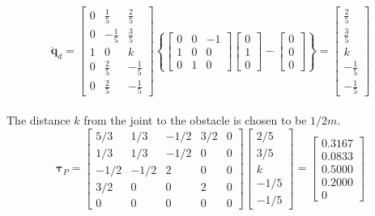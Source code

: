 \begin{equation}
    \mathbf{\ddot{q}}_d =
    \begin{bmatrix}
        0 & \frac{1}{5} & \frac{2}{5}\\
        0 & -\frac{1}{5} & \frac{3}{5}\\
        1 & 0 & k \\
        0 & \frac{2}{5} & -\frac{1}{5}\\
        0 & \frac{2}{5} & -\frac{1}{5}
    \end{bmatrix}\left\{
    \begin{bmatrix}
        0 & 0 & -1\\
        1 & 0 & 0\\
        0 & 1 & 0
    \end{bmatrix}
    \begin{bmatrix}
        0\\   1\\   0
    \end{bmatrix}-
    \begin{bmatrix}
        0\\   0\\   0
    \end{bmatrix}\right\}=
    \begin{bmatrix}
        \frac{2}{5}\\
        \frac{3}{5}\\
        k \\
        -\frac{1}{5}\\
        -\frac{1}{5}
    \end{bmatrix}
\end{equation}
\\
The distance $k$ from the joint to the obstacle is chosen to be $1/2 m$.
\begin{equation}
    \boldsymbol{\tau}_P = 
    \begin{bmatrix}
        5/3 & 1/3 & -1/2 & 3/2 & 0 \\
        1/3 & 1/3 & -1/2 & 0 & 0 \\
        -1/2 & -1/2 & 2 & 0 & 0 \\
        3/2 & 0 & 0 & 2 & 0 \\
        0 & 0 & 0 & 0 & 0 
    \end{bmatrix}
    \begin{bmatrix}
        2/5\\
        3/5\\
        k \\
        -1/5\\
        -1/5
    \end{bmatrix}=
    \begin{bmatrix}
        0.3167\\
        0.0833\\
        0.5000 \\
        0.2000\\
        0
    \end{bmatrix}
\end{equation}

